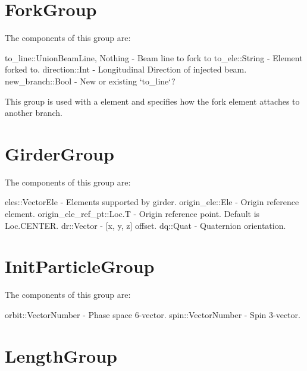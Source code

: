 \section{ForkGroup}
\label{s:fork.g}

The components of this group are:
\begin{example}
  to_line::Union{BeamLine, Nothing}   - Beam line to fork to
  to_ele::String                      - Element forked to.
  direction::Int                      - Longitudinal Direction of injected beam.
  new_branch::Bool                    - New or existing `to_line`?
\end{example}

This group is used with a  element and specifies how the fork element attaches to
another branch.

\section{GirderGroup}
\label{s:girder.g}

The components of this group are:
\begin{example}
  eles::Vector{Ele}         - Elements supported by girder. 
  origin_ele::Ele           - Origin reference element. 
  origin_ele_ref_pt::Loc.T  - Origin reference point. Default is Loc.CENTER. 
  dr::Vector                - [x, y, z] offset. 
  dq::Quat                   - Quaternion orientation. 
\end{example}


\section{InitParticleGroup}
\label{s:init.particle.g}

The components of this group are:
\begin{example}
  orbit::Vector{Number}     - Phase space 6-vector. 
  spin::Vector{Number}      - Spin 3-vector. \end{example}

\section{LengthGroup}
\label{s:length.g}

